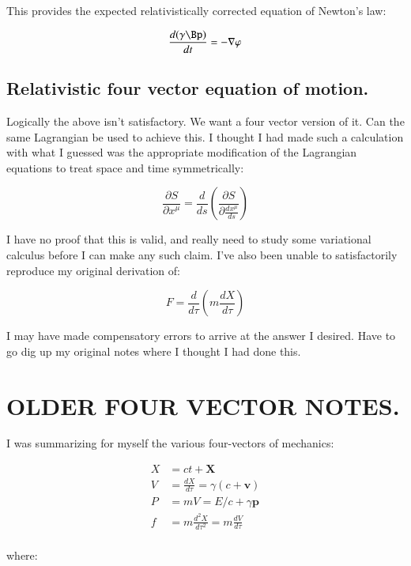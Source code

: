 \documentclass{article}      %
\newcommand{\grad}[0]{\nabla}
\newcommand{\PD}[2]{ \frac{\partial{#1}}{\partial {#2}} }
\begin{document}
This provides the expected relativistically corrected equation of Newton's law:

\begin{equation}
\frac{d (\gamma \Bp)}{dt} = -\grad \varphi
\end{equation}

\subsection{ Relativistic four vector equation of motion. }

Logically the above isn't satisfactory.  We want a four vector version of it.  Can the same Lagrangian
be used to achieve this.  I thought I had made such a calculation with what I guessed was the appropriate
modification of the Lagrangian equations to treat space and time symmetrically:

\begin{equation}
\PD{S}{x^{\mu}} = \frac{d}{ds} \left( \PD{S}{\frac{d x^{\mu}}{ds}} \right)
\end{equation}

I have no proof that this is valid, and really need to study some variational calculus before I can make any
such claim.  I've also been unable to satisfactorily reproduce my original derivation of:

\begin{equation}
F = \frac{d}{d\tau}\left( m\frac{dX}{d\tau} \right)
\end{equation}

I may have made compensatory errors to arrive at the answer I desired.  Have to go dig up my original notes
where I thought I had done this.

\section{ OLDER FOUR VECTOR NOTES. }

I was summarizing for myself the various four-vectors of mechanics:

\begin{align*}
X &= ct + \mathbf{X} \\
V &= \frac{d X}{d\tau} = \gamma(c + \mathbf{v}) \\
P &= m V = E/c + \gamma\mathbf{p} \\
f &= m\frac{d^2 X}{d\tau^2} = m\frac{d V}{d\tau} \\
\end{align*}

where:
\end{document}
